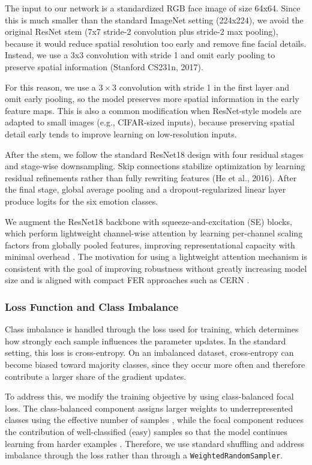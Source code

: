 The input to our network is a standardized RGB face image of size 64x64. Since this is much smaller than the standard ImageNet setting (224x224), we avoid the original ResNet stem (7x7 stride-2 convolution plus stride-2 max pooling), because it would reduce spatial resolution too early and remove fine facial details. Instead, we use a 3x3 convolution with stride 1 and omit early pooling to preserve spatial information (Stanford CS231n, 2017).

For this reason, we use a $3 \times 3$ convolution with stride 1 in the first layer and omit early pooling, so the model preserves more spatial information in the early feature maps. This is also a common modification when ResNet-style models are adapted to small images (e.g., CIFAR-sized inputs), because preserving spatial detail early tends to improve learning on low-resolution inputs.

After the stem, we follow the standard ResNet18 design with four residual stages and stage-wise downsampling. Skip connections stabilize optimization by learning residual refinements rather than fully rewriting features (He et al., 2016). After the final stage, global average pooling and a dropout-regularized linear layer produce logits for the six emotion classes.

We augment the ResNet18 backbone with squeeze-and-excitation (SE) blocks, which perform lightweight channel-wise attention by learning per-channel scaling factors from globally pooled features, improving representational capacity with minimal overhead \cite{hu2018senet}. The motivation for using a lightweight attention mechanism is consistent with the goal of improving robustness without greatly increasing model size and is aligned with compact FER approaches such as CERN \cite{GERA20229}.

\subsubsection{Loss Function and Class Imbalance}

Class imbalance is handled through the loss used for training, which determines how strongly each sample influences the parameter updates. In the standard setting, this loss is cross-entropy. On an imbalanced dataset, cross-entropy can become biased toward majority classes, since they occur more often and therefore contribute a larger share of the gradient updates.

To address this, we modify the training objective by using class-balanced focal loss. The class-balanced component assigns larger weights to underrepresented classes using the effective number of samples \cite{cui2019classbalanced}, while the focal component reduces the contribution of well-classified (easy) samples so that the model continues learning from harder examples \cite{lin2017focal}. Therefore, we use standard shuffling and address imbalance through the loss rather than through a \texttt{WeightedRandomSampler}.

